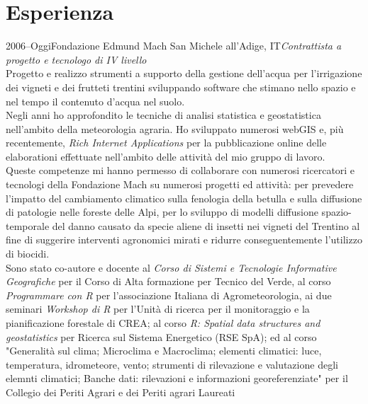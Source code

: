 \documentclass{curriculum}
\begin{document}
    
    \section{Esperienza}
    \begin{entrylist}
    \entry 
        {2006--Oggi}{Fondazione Edmund Mach} {San Michele all'Adige, IT}{\emph{Contrattista a progetto e tecnologo di IV livello}\hfill\vspace{3pt}\\
        Progetto e realizzo strumenti a supporto della gestione dell'acqua per l'irrigazione dei vigneti e dei frutteti trentini sviluppando software che stimano nello spazio e nel tempo il contenuto d'acqua nel suolo.
        \\Negli anni ho approfondito le tecniche di analisi statistica e geostatistica nell'ambito della meteorologia agraria. Ho sviluppato numerosi webGIS e, più recentemente, \textit{Rich Internet Applications} per la pubblicazione online delle elaborationi effettuate nell'ambito delle attività del mio gruppo di lavoro. 
        \\Queste competenze mi hanno permesso di collaborare con numerosi ricercatori e tecnologi della Fondazione Mach su numerosi progetti ed attività: per prevedere l'impatto del cambiamento climatico sulla fenologia della betulla e sulla diffusione di patologie nelle foreste delle Alpi, per lo sviluppo di modelli diffusione spazio-temporale del danno causato da specie aliene di insetti nei vigneti del Trentino al fine di suggerire interventi agronomici mirati e ridurre conseguentemente l'utilizzo di biocidi.
        \\Sono stato co-autore e docente al \textit{Corso di Sistemi e Tecnologie Informative Geografiche} per il Corso di Alta formazione per Tecnico del Verde, al corso \textit{Programmare con R} per l'associazione Italiana di Agrometeorologia, ai due seminari \textit{Workshop di R} per l'Unità di ricerca per il monitoraggio e la pianificazione forestale di CREA; al corso \textit{R: Spatial data structures and geostatistics} per Ricerca sul Sistema Energetico (RSE SpA); ed al corso "Generalità sul clima; Microclima e Macroclima; elementi climatici: luce, temperatura, idrometeore, vento; strumenti di rilevazione e valutazione degli elemnti climatici; Banche dati: rilevazioni e informazioni georeferenziate" per il Collegio dei Periti Agrari e dei Periti agrari Laureati} 
    \end{entrylist}
    
\end{document}

